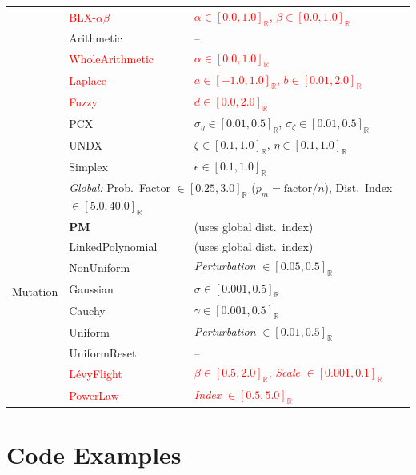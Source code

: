 \documentclass[journal]{IEEEtran}
\newcommand{\Realdomain}[1]{[#1]_{\mathbb{R}}}
\begin{document}
\begin{table}[htbp]
{\begin{tabular}{lll}
 & \textcolor{red}{BLX-$\alpha\beta$} & \textcolor{red}{$\alpha \in \Realdomain{0.0, 1.0}$, $\beta \in \Realdomain{0.0, 1.0}$} \\
 & Arithmetic & -- \\
 & \textcolor{red}{WholeArithmetic} & \textcolor{red}{$\alpha \in \Realdomain{0.0, 1.0}$} \\
 & \textcolor{red}{Laplace} & \textcolor{red}{$a \in \Realdomain{-1.0, 1.0}$, $b \in \Realdomain{0.01, 2.0}$} \\
 & \textcolor{red}{Fuzzy} & \textcolor{red}{$d \in \Realdomain{0.0, 2.0}$} \\
 & PCX & $\sigma_\eta \in \Realdomain{0.01, 0.5}$, $\sigma_\zeta \in \Realdomain{0.01, 0.5}$ \\
 & UNDX & $\zeta \in \Realdomain{0.1, 1.0}$, $\eta \in \Realdomain{0.1, 1.0}$ \\
 & Simplex & $\epsilon \in \Realdomain{0.1, 1.0}$ \\ \midrule
\multirow{10}{*}{Mutation} & \multicolumn{2}{l}{\textit{Global:} Prob.\ Factor $\in \Realdomain{0.25, 3.0}$ ($p_m = \text{factor}/n$), Dist.\ Index $\in \Realdomain{5.0, 40.0}$} \\
 & \textbf{PM} & (uses global dist.\ index) \\
 & LinkedPolynomial & (uses global dist.\ index) \\
 & NonUniform & \textit{Perturbation} $\in \Realdomain{0.05, 0.5}$ \\
 & Gaussian & $\sigma \in \Realdomain{0.001, 0.5}$ \\
 & Cauchy & $\gamma \in \Realdomain{0.001, 0.5}$ \\
 & Uniform & \textit{Perturbation} $\in \Realdomain{0.01, 0.5}$ \\
 & UniformReset & -- \\
 & \textcolor{red}{L\'evyFlight} & \textcolor{red}{$\beta \in \Realdomain{0.5, 2.0}$, \textit{Scale} $\in \Realdomain{0.001, 0.1}$} \\
 & \textcolor{red}{PowerLaw} & \textcolor{red}{\textit{Index} $\in \Realdomain{0.5, 5.0}$} \\ \bottomrule
\end{tabular}%
}
\end{table}

\section{Code Examples}
\label{app:code}
\end{document}
